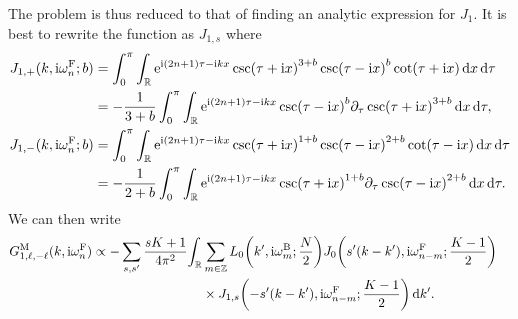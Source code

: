\documentclass[english, parskip=full]{scrartcl}
\begin{document}
The problem is thus reduced to that of finding an analytic expression for $J_1$.
It is best to rewrite the function as $J_{1,s}$ where
\begin{align}
J_{1,+}(k,\i\omega_n^\F; b) &= \intx{0}{\pi}{\intr{\powe{\i (2n+1)\tau - \i kx} \csc\kla*{\tau + \i x}^{3+b} \csc\kla*{\tau - \i x}^{b} \cot\kla*{\tau + \i x} }{x} }{\tau}\\
&= -\frac{1}{3+b} \intx{0}{\pi}{\intr{\powe{\i (2n+1)\tau - \i kx} \csc\kla*{\tau - \i x}^{b} \partial_\tau \csc\kla*{\tau + \i x}^{3+b} }{x} }{\tau},\\
J_{1,-}(k,\i\omega_n^\F; b) &= \intx{0}{\pi}{\intr{\powe{\i (2n+1)\tau - \i kx} \csc\kla*{\tau + \i x}^{1+b} \csc\kla*{\tau - \i x}^{2+b} \cot\kla*{\tau - \i x} }{x} }{\tau}\\
&= -\frac{1}{2+b} \intx{0}{\pi}{\intr{\powe{\i (2n+1)\tau - \i kx} \csc\kla*{\tau + \i x}^{1+b} \partial_\tau \csc\kla*{\tau - \i x}^{2+b} }{x} }{\tau}.
\end{align}
We can then write
\begin{align}
G_{1,\ell,-\ell}^\M(k,\i\omega_n^\F) &\propto -\sum_{s,s'} \frac{sK+1}{4\pi^2} \bsplit{\intr{ &\sum_{m\in\mathbb{Z}}  L_0\kla*{k', \i \omega_m^\B; \frac{N}{2}} J_0\kla*{s'(k-k'), \i \omega_{n-m}^\F; \frac{K-1}{2}}\\
&\times J_{1,s}\kla*{-s'(k-k'), \i \omega_{n-m}^\F; \frac{K-1}{2}} }{k'}.}
\end{align}
\end{document}
